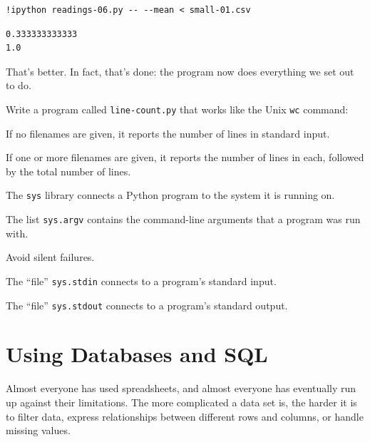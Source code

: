 \documentclass{book}
\begin{document}
\begin{verbatim}
!ipython readings-06.py -- --mean < small-01.csv
\end{verbatim}

\begin{verbatim}
0.333333333333
1.0
\end{verbatim}

That's better. In fact, that's done: the program now does everything we
set out to do.

\begin{challenge}
  Write a program called \texttt{line-count.py} that works like the Unix
  \texttt{wc} command:

  \begin{swcitemize}
  \item
    If no filenames are given, it reports the number of lines in
    standard input.
  \item
    If one or more filenames are given, it reports the number of lines
    in each, followed by the total number of lines.
   \end{swcitemize}
\end{challenge}

\begin{keypoints}
\begin{swcitemize}
\item
  The \texttt{sys} library connects a Python program to the system it is
  running on.
\item
  The list \texttt{sys.argv} contains the command-line arguments that a
  program was run with.
\item
  Avoid silent failures.
\item
  The ``file'' \texttt{sys.stdin} connects to a program's standard
  input.
\item
  The ``file'' \texttt{sys.stdout} connects to a program's standard
  output.
\end{swcitemize}
\end{keypoints}

\chapter{Using Databases and SQL}\label{s:sql}

Almost everyone has used spreadsheets, and almost everyone has
eventually run up against their limitations. The more complicated a data
set is, the harder it is to filter data, express relationships between
different rows and columns, or handle missing values.
\end{document}
